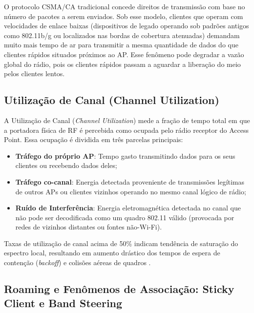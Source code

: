 O protocolo CSMA/CA tradicional concede direitos de transmissão com base no número de pacotes a serem enviados. Sob esse modelo, clientes que operam com velocidades de enlace baixas (dispositivos de legado operando sob padrões antigos como 802.11b/g ou localizados nas bordas de cobertura atenuadas) demandam muito mais tempo de ar para transmitir a mesma quantidade de dados do que clientes rápidos situados próximos ao AP. Esse fenômeno pode degradar a vazão global do rádio, pois os clientes rápidos passam a aguardar a liberação do meio pelos clientes lentos.

\subsection{Utilização de Canal (Channel Utilization)}
\label{subsec:fundamentacao_utilizacao}

A Utilização de Canal (\textit{Channel Utilization}) mede a fração de tempo total em que a portadora física de RF é percebida como ocupada pelo rádio receptor do Access Point. Essa ocupação é dividida em três parcelas principais:
\begin{itemize}
    \item \textbf{Tráfego do próprio AP}: Tempo gasto transmitindo dados para os seus clientes ou recebendo dados deles;
    \item \textbf{Tráfego co-canal}: Energia detectada proveniente de transmissões legítimas de outros APs ou clientes vizinhos operando no mesmo canal lógico de rádio;
    \item \textbf{Ruído de Interferência}: Energia eletromagnética detectada no canal que não pode ser decodificada como um quadro 802.11 válido (provocada por redes de vizinhos distantes ou fontes não-Wi-Fi).
\end{itemize}
Taxas de utilização de canal acima de 50\% indicam tendência de saturação do espectro local, resultando em aumento drástico dos tempos de espera de contenção (\textit{backoff}) e colisões aéreas de quadros \cite{cisco2020design, gast2005}.

\subsection{Roaming e Fenômenos de Associação: Sticky Client e Band Steering}
\label{subsec:fundamentacao_associacao}

